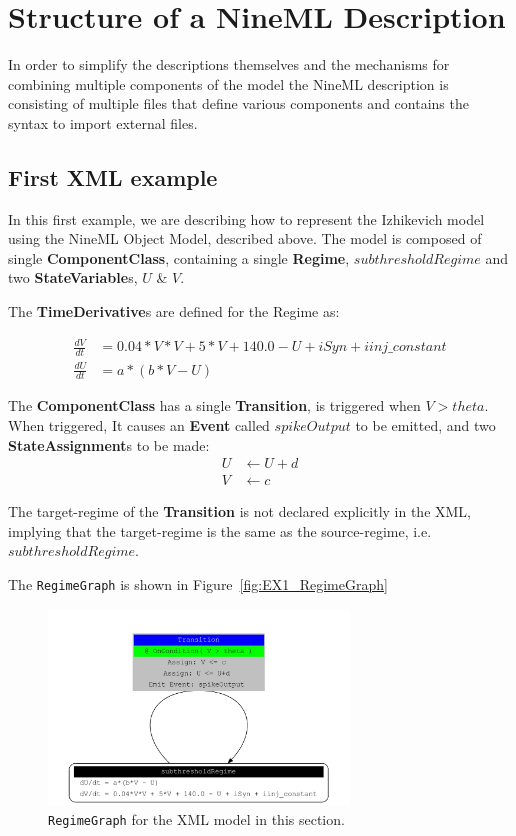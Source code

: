 \documentclass{article}
\newcommand{\ComponentClass}{{\bf{ComponentClass}}\xspace}
\newcommand{\StateVariables}{{\bf{StateVariable}}s\xspace}
\newcommand{\StateAssignments}{{\bf{StateAssignment}}s\xspace}
\newcommand{\TimeDerivatives}{{\bf{TimeDerivative}}s\xspace}
\newcommand{\Event}{{\bf{Event}}\xspace}
\newcommand{\Regime}{{\bf{Regime}}\xspace}
\newcommand{\Transition}{{\bf{Transition}}\xspace}
\begin{document}
\newpage

\section{Structure of a NineML Description}

In order to simplify the descriptions themselves and the mechanisms for
combining multiple components of the model the NineML description
is consisting of multiple files that define various components and
contains the syntax to import external files.

\subsection{First XML example}

\noindent
In this first example, we are describing how to represent the Izhikevich model using the NineML Object Model, described above.
The model is composed of single \ComponentClass, containing a single \Regime, $subthresholdRegime$ and two
\StateVariables, $U$ \& $V$.

\noindent
The \TimeDerivatives are defined for the Regime as:

\begin{align}
\frac{dV}{dt} &= 0.04*V*V + 5*V + 140.0 - U + iSyn + iinj\_constant   \\
\frac{dU}{dt} &= a * ( b* V -U )
\end{align}

\noindent
The \ComponentClass has a single \Transition, is triggered when $V>theta$. When
triggered, It causes an \Event called $spikeOutput$ to be emitted, and two
\StateAssignments to be made:
\begin{align}
U &\leftarrow U + d \\
V &\leftarrow c
\end{align}

\noindent
The target-regime of the \Transition is not declared explicitly in the XML,
implying that the
target-regime is the same as the source-regime, i.e. $subthresholdRegime$.

The {\tt RegimeGraph} is shown in Figure~\ref{fig:EX1_RegimeGraph}

\begin{figure}[htb!]
\center
\includegraphics[width=8cm]{figures/example_IzRegimeTransGraph.pdf}
\protect\caption{{\tt RegimeGraph} for the XML model in this section.}
\label{fig:EX3_RegimeGraph}
\end{figure}
\end{document}
